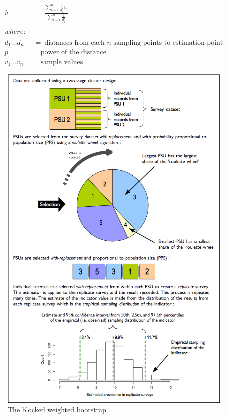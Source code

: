 \documentclass[12pt,a4paper]{article}
\begin{document}
~

\[\begin{aligned}
\hat{v} & ~ = ~ \frac{\displaystyle \sum\limits_{i = 1}^{n} \frac{1}{d_{i}^{p}}v_{i}}{\displaystyle \sum\limits_{i = 1}^{n}\frac{1}{d_{i}^{p}}} \\
\\
where: & \\
\\
d_1 \ldots d_n & ~ = ~ \text{distances from each } n \text{ sampling points to estimation point} \\
p & ~ = ~ \text{power of the distance} \\
v_1 \ldots v_n & ~ = ~ \text{sample values}
\end{aligned}\]

\newpage

\begin{figure}[H]

{\centering \includegraphics[width=9.76in]{figures/bbw} 

}

\caption{The blocked weighted bootstrap}\label{fig:indicators31}
\end{figure}
\end{document}

